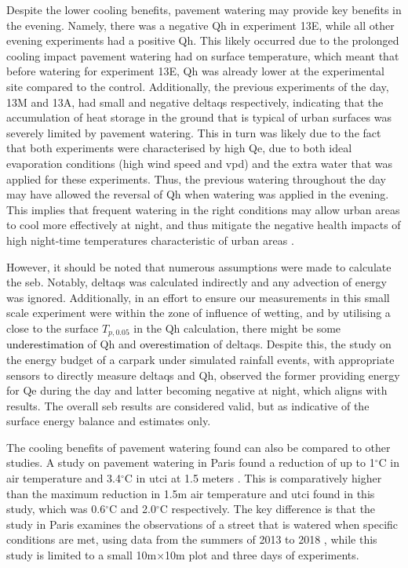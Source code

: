 \documentclass[final,3p,times,authoryear]{elsarticle}
\newcommand{\add}[1]{\textcolor{black}{#1}}
\newcommand{\remove}[1]{\textcolor{red}{\st{}}}
\begin{document}
Despite the lower cooling benefits, pavement watering may provide key benefits in the evening. Namely, there was a negative \gls{Qh} in experiment 13E, while all other evening experiments had a positive \gls{Qh}. This likely occurred due to the prolonged cooling impact pavement watering had on surface temperature, which meant that before watering for experiment 13E, \gls{Qh} was already lower at the experimental site compared to the control. Additionally, the previous experiments of the day, 13M and 13A, had small and negative \gls{deltaqs} respectively, indicating that the accumulation of heat storage in the ground that is typical of urban surfaces \citep{Oke1982,Anandakumar1999} was severely limited by pavement watering. This in turn was likely due to the fact that both experiments were characterised by high \gls{Qe}, due to both ideal evaporation conditions (high wind speed and \gls{vpd}) and the extra water that was applied for these experiments. Thus, the previous watering throughout the day may have allowed the reversal of \gls{Qh} when watering was applied in the evening. This implies that frequent watering in the right conditions may allow urban areas to cool more effectively at night, and thus mitigate the negative health impacts of high night-time temperatures characteristic of urban areas \citep{Clarke1972,Coutts2010}.

However, it should be noted that numerous assumptions were made to calculate the \gls{seb}. Notably, \gls{deltaqs} was calculated indirectly and any advection of energy was ignored. Additionally, in an effort to ensure our measurements in this small scale experiment were within the zone of influence of wetting, and by utilising a close to the surface $T_{p,0.05}$ in the \gls{Qh} calculation, there might be some \remove{overestimation}\add{underestimation} of \gls{Qh} and \remove{underestimation}\add{overestimation} of \gls{deltaqs}. Despite this, the \cite{Cohard2018} study on the energy budget of a carpark under simulated rainfall events, with appropriate sensors to directly measure \gls{deltaqs} and \gls{Qh}, observed the former providing energy for \gls{Qe} during the day and latter becoming negative at night, which aligns with results.  The overall \gls{seb} results are considered valid, but as indicative of the surface energy balance and estimates only.

The cooling benefits of pavement watering found can also be compared to other studies. A study on pavement watering in Paris found a reduction of up to 1$^{\circ}$C in air temperature and 3.4$^{\circ}$C in \gls{utci} at 1.5 meters \citep{Parison2020}. This is comparatively higher than the maximum reduction in 1.5m air temperature and \gls{utci} found in this study, which was 0.6$^{\circ}$C and 2.0$^{\circ}$C respectively. The key difference is that the study in Paris examines the observations of a street that is watered when specific conditions are met, using data from the summers of 2013 to 2018 \citep{Parison2020}, while this study is limited to a small 10m$\times$10m plot and three days of experiments.
\end{document}
